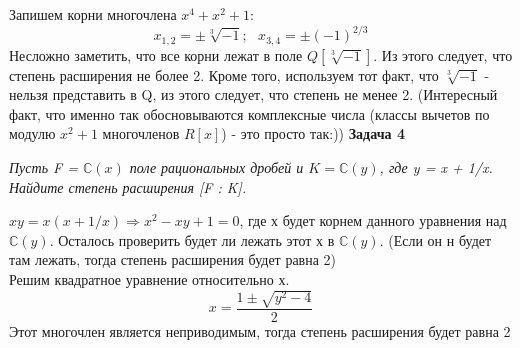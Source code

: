 \documentclass{article}
\begin{document}
Запишем корни многочлена $x^4 + x^2 + 1$:
$$x_{1,2}=\pm\sqrt[3]{-1};~~~x_{3,4}=\pm(-1)^{2/3}$$
Несложно заметить, что все корни лежат в поле $Q[\sqrt[3]{-1}]$. Из этого следует, что степень расширения не более 2. Кроме того, используем тот факт, что $\sqrt[3]{-1}$ - нельзя представить в Q, из этого следует, что степень не менее 2. (Интересный факт, что именно так обосновываются комплексные числа (классы вычетов по модулю $x^2+1$ многочленов $R[x]$) - это просто так:))
\newline
\newline
 \noindent \textbf{Задача 4}
\begin{center}
\textit{Пусть F = $\mathbb{C}(x)$   поле рациональных дробей и $K = \mathbb{C}(y)$, где y = x + 1/x. Найдите степень расширения [F : K].}
\end{center}
$ xy = x(x + 1/x) \Rightarrow x^2-xy+1=0$,  где х будет корнем данного уравнения над $\mathbb{C}(y)$. Осталось проверить будет ли лежать этот х в $\mathbb{C}(y)$. (Если он н будет там лежать, тогда степень расширения будет равна 2)\\
Решим квадратное уравнение относительно х.
$$x=\frac{1\pm \sqrt{y^2-4}}{2}$$
 Этот многочлен является неприводимым, тогда степень расширения будет равна 2
 
\end{document}
